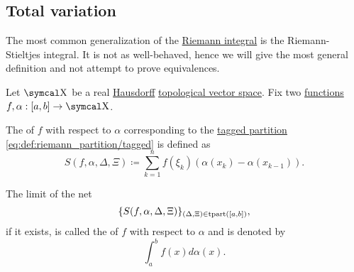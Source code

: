 \subsection{Total variation}\label{subsec:total_variation}

\begin{definition}\label{def:riemann_stieltjes_integral}
  The most common generalization of the \hyperref[def:riemann_integral]{Riemann integral} is the Riemann-Stieltjes integral. It is not as well-behaved, hence we will give the most general definition and not attempt to prove equivalences.

  Let \( \CX \) be a real \hyperref[def:separation_axioms/T2]{Hausdorff} \hyperref[def:topological_vector_space]{topological vector space}. Fix two \hyperref[def:function/single_valued]{functions} \( f, \alpha: [a, b] \to \CX \).

  The  of \( f \) with respect to \( \alpha \) corresponding to the \hyperref[def:riemann_partition/tagged]{tagged partition} \eqref{eq:def:riemann_partition/tagged} is defined as
  \begin{equation*}
    S(f, \alpha, \Delta, \Xi) \coloneqq \sum_{k=1}^n f(\xi_k) (\alpha(x_k) - \alpha(x_{k-1})).
  \end{equation*}

  The limit of the net
  \begin{equation}\label{eq:def:riemann_stieltjes_integral/net}
    \{ S(f, \alpha, \Delta, \Xi) \}_{(\Delta, \Xi) \in \operatorname{tpart}([a, b])},
  \end{equation}
  if it exists, is called the  of \( f \) with respect to \( \alpha \) and is denoted by
  \begin{equation*}
    \int_a^b f(x) d \alpha(x).
  \end{equation*}
\end{definition}
